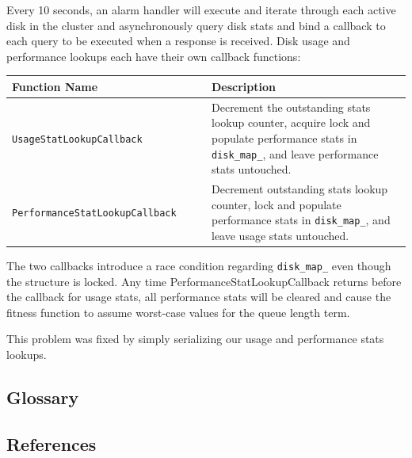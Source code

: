 \documentclass[12pt]{article}
\begin{document}
  Every 10 seconds, an alarm handler will execute and iterate through each
  active disk in the cluster and asynchronously query disk stats and bind a
  callback to each query to be executed when a response is received. Disk usage
  and performance lookups each have their own callback functions:

  \begin{center}
    \begin{tabular}{ | p{0.5\linewidth} | p{0.5\linewidth} | }
      \hline
      \textbf{Function Name} & \textbf{Description} \\ \hline
      \verb|UsageStatLookupCallback| & Decrement the outstanding stats lookup
                                       counter, acquire lock and populate
                                       performance stats in \verb|disk_map_|,
                                       and leave performance stats untouched.
                                       \\ \hline

      \verb|PerformanceStatLookupCallback| & Decrement outstanding stats
                                             lookup counter, lock and
                                             populate performance stats in
                                             \verb|disk_map_|, and leave
                                             usage stats untouched. \\ \hline

      \hline
    \end{tabular}
  \end{center}

  The two callbacks introduce a race condition regarding \verb|disk_map_| even
  though the structure is locked. Any time PerformanceStatLookupCallback
  returns before the callback for usage stats, all performance stats will be
  cleared and cause the fitness function to assume worst-case values for the
  queue length term.

  This problem was fixed by simply serializing our usage and performance stats
  lookups.

  \subsection{Glossary}


  \subsection{References}

\end{document}
